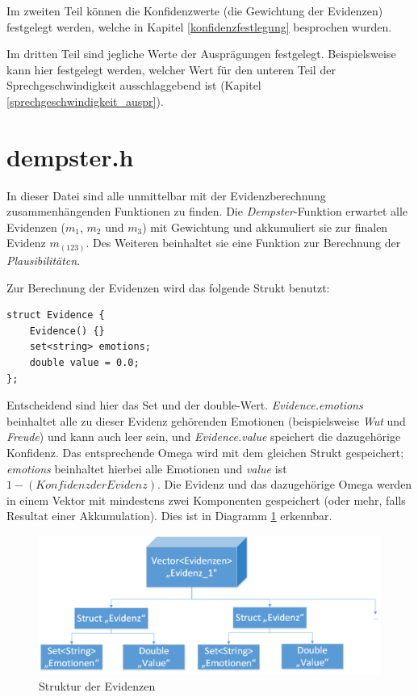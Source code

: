 Im zweiten Teil können die Konfidenzwerte (die Gewichtung der Evidenzen) festgelegt werden, welche in Kapitel \ref{konfidenzfestlegung} besprochen wurden. 

Im dritten Teil sind jegliche Werte der Ausprägungen festgelegt. Beispielsweise kann hier festgelegt werden, welcher Wert für den unteren Teil der Sprechgeschwindigkeit ausschlaggebend ist (Kapitel \ref{sprechgeschwindigkeit_auspr}).

\section{dempster.h}
In dieser Datei sind alle unmittelbar mit der Evidenzberechnung zusammenhängenden Funktionen zu finden. Die \textit{Dempster}-Funktion erwartet alle Evidenzen (\(m_1\), \(m_2\) und \(m_3\)) mit Gewichtung und akkumuliert sie zur finalen Evidenz \(m_(123)\). Des Weiteren beinhaltet sie eine Funktion zur Berechnung der \textit{Plausibilitäten}.

Zur Berechnung der Evidenzen wird das folgende Strukt benutzt:

\begin{lstlisting}[caption=Strukt zur Evidenzberechnung, label=structcode]
struct Evidence {
	Evidence() {}
	set<string> emotions;
	double value = 0.0;
};
\end{lstlisting}

Entscheidend sind hier das Set und der double-Wert. \textit{Evidence.emotions} beinhaltet alle zu dieser Evidenz gehörenden Emotionen (beispielsweise \textit{Wut} und \textit{Freude}) und kann auch leer sein, und \textit{Evidence.value} speichert die dazugehörige Konfidenz. Das entsprechende Omega wird mit dem gleichen Strukt gespeichert; \textit{emotions} beinhaltet hierbei alle Emotionen und \textit{value} ist \(1 - (Konfidenz der Evidenz)\). Die Evidenz und das dazugehörige Omega werden in einem Vektor mit mindestens zwei Komponenten gespeichert (oder mehr, falls Resultat einer Akkumulation). Dies ist in Diagramm \ref{diagramm_evidenzen} erkennbar.

\begin{figure}
	\centering
	\includegraphics[width=\textwidth]{images/Evidenzen_diagramm.png}
	\caption{Struktur der Evidenzen}
	\label{diagramm_evidenzen}
\end{figure}


